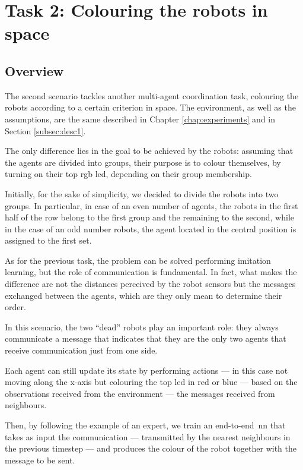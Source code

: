 \section{Task 2: Colouring the robots in space}
\label{sec:task2}

\subsection{Overview}
\label{subsec:desc2}

The second scenario tackles another multi-agent coordination task, colouring the 
robots according to a certain criterion in space. 
The environment, as well as the assumptions, are the same described in Chapter 
\ref{chap:experiments} and in Section \ref{subsec:desc1}.

The only difference lies in the goal to be achieved by the robots: assuming that 
the agents are divided into groups, their purpose is to colour themselves, by 
turning on their top \gls{rgb} \gls{led}, depending on their group membership.

Initially, for the sake of simplicity, we decided to divide the robots into two 
groups. In particular, in case of an even number of agents, the robots in the first 
half of the row belong to the first group and the remaining to the second, while in 
the case of an odd number robots, the agent located in the central position is 
assigned to the first set.

As for the previous task, the problem can be solved performing imitation 
learning, but the role of communication is fundamental. In fact, what makes the 
difference are not the distances perceived by the robot sensors but the messages 
exchanged between the agents, which are they only mean to determine their 
order. 

In this scenario, the two ``dead'' robots play an important role: they always 
communicate a message that indicates that they are the only two agents that 
receive communication just from one side.

Each agent can still update its state by performing actions — in this case not 
moving along the x-axis but colouring the top \gls{led} in red or blue — based on 
the observations received from the environment — the messages received from 
neighbours. 

Then, by following the example of an expert, we train an end-to-end \gls{nn} 
that takes as input the communication — transmitted by the nearest neighbours in 
the previous timestep — and produces the colour of the robot together with the 
message to be sent.

